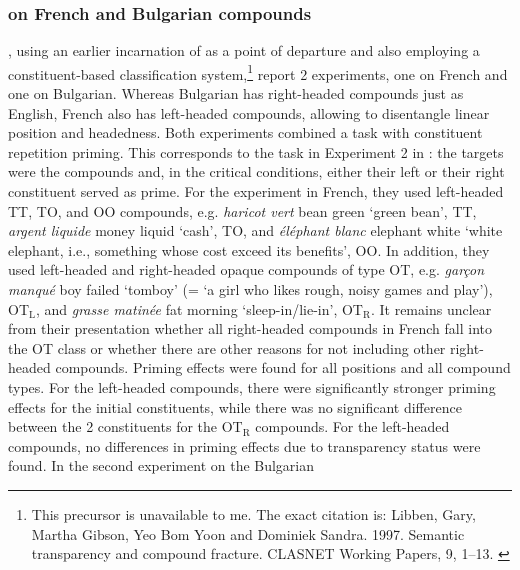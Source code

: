 \subsubsection{\citet{Jaremaetal:1999} on French and Bulgarian compounds}

\citet{Jaremaetal:1999}, using an earlier incarnation of
\citet{Libbenetal:2003} as a point of departure and also employing a
constituent-based classification system,\footnote{This precursor is
  unavailable to me. The exact citation is: Libben, Gary,  Martha Gibson, Yeo Bom Yoon 
  and Dominiek Sandra. 1997. Semantic transparency and compound
  fracture. CLASNET Working Papers, 9, 1--13. \label{fn:Libben-precursor}}
report 2 experiments, one on French and one on Bulgarian. Whereas Bulgarian
has right-headed compounds just as English, French also has left-headed
compounds, allowing to disentangle linear position and headedness.  Both
experiments combined a  task with constituent repetition
priming. 
This corresponds to the task in Experiment 2 in
\citet{Libbenetal:2003}: the targets were the compounds and, in the critical
conditions, either their left or their right constituent served as
prime. 
For the experiment in French, they used left-headed TT, TO, and OO compounds,
e.g. \emph{haricot vert} bean green `green bean', TT,  \emph{argent liquide} money liquid `cash', TO, and
\emph{\'{e}l\'{e}phant blanc} elephant white `white elephant, i.e., something whose cost
exceed its benefits', OO. In addition, they used left-headed and right-headed opaque compounds of type OT,
e.g. \emph{gar\c{c}on manqu\'{e}} boy failed `tomboy' (= `a girl who likes rough, noisy
games and play'), OT$_{\text{L}}$, and \emph{grasse matin\'{e}e} fat morning
`sleep-in/lie-in', OT$_{\text{R}}$. It remains unclear from their
presentation whether all right-headed compounds in French fall into
the OT class or whether there are other reasons for not including
other right-headed compounds. %
Priming effects were
found for all positions and all compound types. For
the left-headed compounds, there were significantly stronger priming effects
for the initial constituents, while there was no significant
difference between the 2 constituents for the OT$_{\text{R}}$ compounds. For
the left-headed compounds, no differences in priming effects due to
transparency status were found. In the second experiment on the Bulgarian
